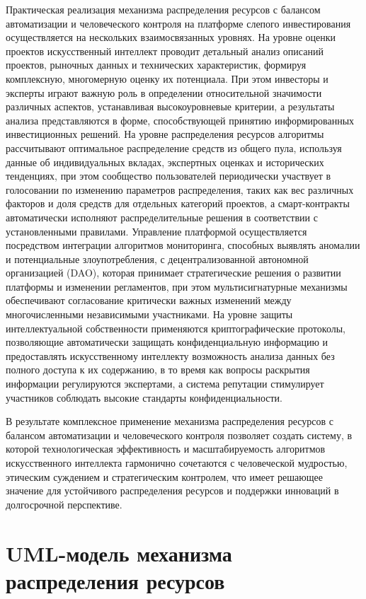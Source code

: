\documentclass[
    candidate, %
    subf, %
    dotsinheaders=false,
]{disser}
\begin{document}
  Практическая реализация механизма распределения ресурсов с балансом автоматизации и человеческого контроля на платформе слепого инвестирования осуществляется на нескольких взаимосвязанных уровнях. На уровне оценки проектов искусственный интеллект проводит детальный анализ описаний проектов, рыночных данных и технических характеристик, формируя комплексную, многомерную оценку их потенциала. При этом инвесторы и эксперты играют важную роль в определении относительной значимости различных аспектов, устанавливая высокоуровневые критерии, а результаты анализа представляются в форме, способствующей принятию информированных инвестиционных решений. На уровне распределения ресурсов алгоритмы рассчитывают оптимальное распределение средств из общего пула, используя данные об индивидуальных вкладах, экспертных оценках и исторических тенденциях, при этом сообщество пользователей периодически участвует в голосовании по изменению параметров распределения, таких как вес различных факторов и доля средств для отдельных категорий проектов, а смарт-контракты автоматически исполняют распределительные решения в соответствии с установленными правилами. Управление платформой осуществляется посредством интеграции алгоритмов мониторинга, способных выявлять аномалии и потенциальные злоупотребления, с децентрализованной автономной организацией (DAO), которая принимает стратегические решения о развитии платформы и изменении регламентов, при этом мультисигнатурные механизмы обеспечивают согласование критически важных изменений между многочисленными независимыми участниками. На уровне защиты интеллектуальной собственности применяются криптографические протоколы, позволяющие автоматически защищать конфиденциальную информацию и предоставлять искусственному интеллекту возможность анализа данных без полного доступа к их содержанию, в то время как вопросы раскрытия информации регулируются экспертами, а система репутации стимулирует участников соблюдать высокие стандарты конфиденциальности.

  В результате комплексное применение механизма распределения ресурсов с балансом автоматизации и человеческого контроля позволяет создать систему, в которой технологическая эффективность и масштабируемость алгоритмов искусственного интеллекта гармонично сочетаются с человеческой мудростью, этическим суждением и стратегическим контролем, что имеет решающее значение для устойчивого распределения ресурсов и поддержки инноваций в долгосрочной перспективе.

  \section{UML-модель механизма распределения ресурсов}
\end{document}
